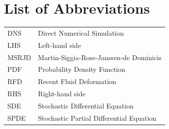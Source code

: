 \documentclass[brazil,12pt,a4paper,openany]{book}
\begin{document}




\newpage
\tableofcontents

\newpage
{}
\listoffigures


\newpage
{}

\chapter*{List of Abbreviations}

\begin{table}[h]
\begin{tabular}{ll}
DNS & Direct Numerical Simulation \\
LHS & Left-hand side \\
MSRJD & Martin-Siggia-Rose-Janssen-de Dominicis \\
PDF  & Probability Density Function \\
RFD & Recent Fluid Deformation \\
RHS & Right-hand side \\
SDE & Stochastic Differential Equation \\
SPDE & Stochastic Partial Differential Equation \\
\end{tabular}
\end{table}

\mainmatter












\newpage
{}
\printbibliography





\appendix



\end{document}
